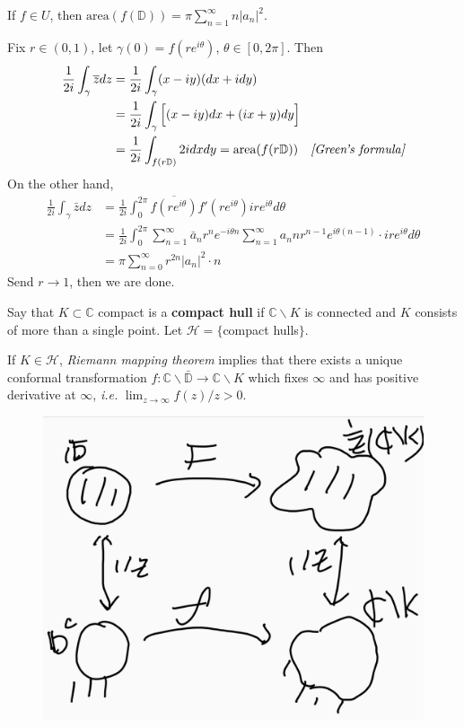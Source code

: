 \documentclass[12pt,a4paper]{article}
\newenvironment{proof}
{\begin{changemargin}{0.5cm}{0.5cm} 
	}%
	{\end{changemargin}
}
\begin{document}
 If $f\in U$, then $\text{area}(f(\mathbb{D})) = \pi \sum_{n=1}^{\infty} n|a_n|^2$.
\begin{proof}
\pf Fix $r\in (0,1)$, let $\gamma(0) = f(re^{i\theta})$, $\theta \in [0, 2\pi]$. Then
\begin{align*}
\frac{1}{2i} \int_{\gamma} \bar{z} dz &= \frac{1}{2i} \int_{\gamma} (x- iy) (dx + idy) \\
&= \frac{1}{2i} \int_{\gamma} \Big[ (x-iy)dx +(ix+y)dy\Big] \\
&= \frac{1}{2i} \int_{f(r\mathbb{D})} 2i dxdy = \text{area}(f(r\mathbb{D})) \quad \emph{[Green's formula]}
\end{align*}
On the other hand,
\begin{align*}
\frac{1}{2i} \int_{\gamma} \bar{z} dz &= \frac{1}{2i}\int_0^{2\pi} \overline{f(re^{i\theta})} f'(re^{i\theta}) ir e^{i\theta} d\theta \\
& = \frac{1}{2i} \int_0^{2\pi} \sum_{n=1}^{\infty}\bar{a}_n r^n e^{-i\theta n} \sum_{n=1}^{\infty} a_n n r^{n-1} e^{i\theta (n-1)} \cdot ire^{i\theta} d\theta\\
& = \pi \sum_{n=0}^{\infty} r^{2n} |a_n|^2 \cdot n
\end{align*}
Send $r\rightarrow 1$, then we are done.

\eop
\end{proof}
\s

 Say that $K\subset \mathbb{C}$ compact is a \textbf{compact hull} if $\mathbb{C}\backslash K$ is connected and $K$ consists of more than a single point. Let $\mathcal{H} = \{$compact hulls$\}$. 

\quad If $K\in \mathcal{H}$, \emph{Riemann mapping theorem} implies that there exists a unique conformal transformation $f: \mathbb{C} \backslash \bar{\mathbb{D}} \rightarrow \mathbb{C} \backslash K$ which fixes $\infty$ and has positive derivative at $\infty$, \textit{i.e.} $\lim_{z\rightarrow \infty} f(z)/z >0$.

\begin{figure}[h]
\begin{center}
    \includegraphics[scale =0.15]{5}
\end{center}
\end{figure}
\s
\end{document}
